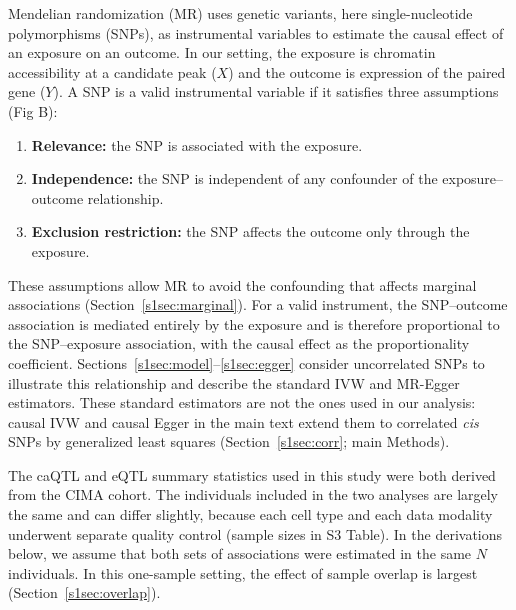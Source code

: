 \noindent Mendelian randomization (MR) uses genetic variants, here single-nucleotide polymorphisms (SNPs), as instrumental variables to estimate the causal effect of an exposure on an outcome. In our setting, the exposure is chromatin accessibility at a candidate peak ($X$) and the outcome is expression of the paired gene ($Y$). A SNP is a valid instrumental variable if it satisfies three assumptions~\cite{lawlor2008mendelian} (Fig B):
\begin{enumerate}
    \item \textbf{Relevance:} the SNP is associated with the exposure.
    \item \textbf{Independence:} the SNP is independent of any confounder of the exposure--outcome relationship.
    \item \textbf{Exclusion restriction:} the SNP affects the outcome only through the exposure.
\end{enumerate}
\noindent These assumptions allow MR to avoid the confounding that affects marginal associations (Section~\ref{s1sec:marginal}). For a valid instrument, the SNP--outcome association is mediated entirely by the exposure and is therefore proportional to the SNP--exposure association, with the causal effect as the proportionality coefficient. Sections~\ref{s1sec:model}--\ref{s1sec:egger} consider uncorrelated SNPs to illustrate this relationship and describe the standard IVW and MR-Egger estimators. These standard estimators are not the ones used in our analysis: causal IVW and causal Egger in the main text extend them to correlated \textit{cis} SNPs by generalized least squares (Section~\ref{s1sec:corr}; main Methods).

\noindent The caQTL and eQTL summary statistics used in this study were both derived from the CIMA cohort. The individuals included in the two analyses are largely the same and can differ slightly, because each cell type and each data modality underwent separate quality control (sample sizes in S3 Table). In the derivations below, we assume that both sets of associations were estimated in the same $N$ individuals. In this one-sample setting, the effect of sample overlap is largest (Section~\ref{s1sec:overlap}).

